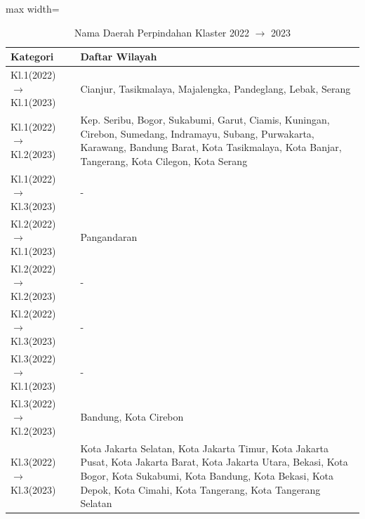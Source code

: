 \begin{table}[H]
\centering
\caption{Nama Daerah Perpindahan Klaster 2022 \(\rightarrow\) 2023} \label{tab:transname2022x2023}
\begin{adjustbox}{max width=\textwidth}
\begin{tabular}{|p{4cm}|p{10cm}|}
\hline
\textbf{Kategori} & \textbf{Daftar Wilayah} \\
\hline
Kl.1(2022) \(\rightarrow\) Kl.1(2023) & Cianjur, Tasikmalaya, Majalengka, Pandeglang, Lebak, Serang \\
\hline
Kl.1(2022) \(\rightarrow\) Kl.2(2023) & Kep. Seribu, Bogor, Sukabumi, Garut, Ciamis, Kuningan, Cirebon, Sumedang, Indramayu, Subang, Purwakarta, Karawang, Bandung Barat, Kota Tasikmalaya, Kota Banjar, Tangerang, Kota Cilegon, Kota Serang \\
\hline
Kl.1(2022) \(\rightarrow\) Kl.3(2023) & - \\
\hline
Kl.2(2022) \(\rightarrow\) Kl.1(2023) & Pangandaran \\
\hline
Kl.2(2022) \(\rightarrow\) Kl.2(2023) & - \\
\hline
Kl.2(2022) \(\rightarrow\) Kl.3(2023) & - \\
\hline
Kl.3(2022) \(\rightarrow\) Kl.1(2023) & - \\
\hline
Kl.3(2022) \(\rightarrow\) Kl.2(2023) & Bandung, Kota Cirebon \\
\hline
Kl.3(2022) \(\rightarrow\) Kl.3(2023) & Kota Jakarta Selatan, Kota Jakarta Timur, Kota Jakarta Pusat, Kota Jakarta Barat, Kota Jakarta Utara, Bekasi, Kota Bogor, Kota Sukabumi, Kota Bandung, Kota Bekasi, Kota Depok, Kota Cimahi, Kota Tangerang, Kota Tangerang Selatan \\
\hline
\end{tabular}
\end{adjustbox}
\end{table}